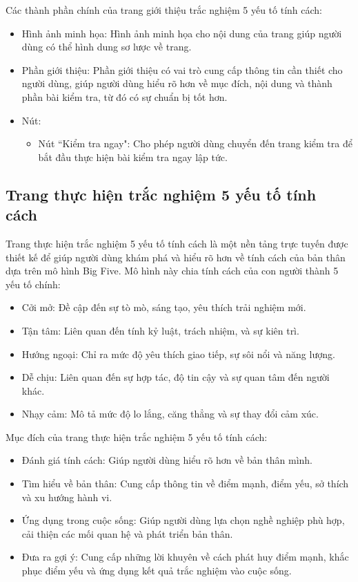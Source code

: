 Các thành phần chính của trang giới thiệu trắc nghiệm 5 yếu tố tính cách:
\begin{itemize}
    \item Hình ảnh minh họa: Hình ảnh minh họa cho nội dung của trang giúp người dùng có thể hình dung sơ lược về trang.
    \item Phần giới thiệu: Phần giới thiệu có vai trò cung cấp thông tin cần thiết cho người dùng, giúp người dùng hiểu rõ hơn về mục đích, nội dung và thành phần bài kiểm tra, từ đó có sự chuẩn bị tốt hơn.
    \item Nút:
        \begin{itemize}
            \item Nút ``Kiểm tra ngay": Cho phép người dùng chuyển đến trang kiểm tra để bắt đầu thực hiện bài kiểm tra ngay lập tức.
        \end{itemize}
\end{itemize}


\subsection{Trang thực hiện trắc nghiệm 5 yếu tố tính cách}
Trang thực hiện trắc nghiệm 5 yếu tố tính cách là một nền tảng trực tuyến được thiết kế để giúp người dùng khám phá và hiểu rõ hơn về tính cách của bản thân dựa trên mô hình Big Five. Mô hình này chia tính cách của con người thành 5 yếu tố chính:
\begin{itemize}
    \item Cởi mở: Đề cập đến sự tò mò, sáng tạo, yêu thích trải nghiệm mới.
    \item Tận tâm: Liên quan đến tính kỷ luật, trách nhiệm, và sự kiên trì.
    \item Hướng ngoại: Chỉ ra mức độ yêu thích giao tiếp, sự sôi nổi và năng lượng.
    \item Dễ chịu: Liên quan đến sự hợp tác, độ tin cậy và sự quan tâm đến người khác.
    \item Nhạy cảm: Mô tả mức độ lo lắng, căng thẳng và sự thay đổi cảm xúc.
\end{itemize}

Mục đích của trang thực hiện trắc nghiệm 5 yếu tố tính cách:
\begin{itemize}
    \item Đánh giá tính cách: Giúp người dùng hiểu rõ hơn về bản thân mình.
    \item Tìm hiểu về bản thân: Cung cấp thông tin về điểm mạnh, điểm yếu, sở thích và xu hướng hành vi.
    \item Ứng dụng trong cuộc sống: Giúp người dùng lựa chọn nghề nghiệp phù hợp, cải thiện các mối quan hệ và phát triển bản thân.
    \item Đưa ra gợi ý: Cung cấp những lời khuyên về cách phát huy điểm mạnh, khắc phục điểm yếu và ứng dụng kết quả trắc nghiệm vào cuộc sống.
\end{itemize}

